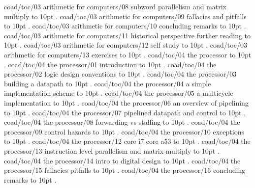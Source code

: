 \smallskip
coad/toc/03 arithmetic for computers/08 subword parallelism and matrix multiply \leaders\hbox to 10pt {\hss.\hss}  \hfill {}
\smallskip
coad/toc/03 arithmetic for computers/09 fallacies and pitfalls \leaders\hbox to 10pt {\hss.\hss}  \hfill {}
\smallskip
coad/toc/03 arithmetic for computers/10 concluding remarks \leaders\hbox to 10pt {\hss.\hss}  \hfill {}
\smallskip
coad/toc/03 arithmetic for computers/11 historical perspective further reading \leaders\hbox to 10pt {\hss.\hss}  \hfill {}
\smallskip
coad/toc/03 arithmetic for computers/12 self study \leaders\hbox to 10pt {\hss.\hss}  \hfill {}
\smallskip
coad/toc/03 arithmetic for computers/13 exercises \leaders\hbox to 10pt {\hss.\hss}  \hfill {}
\smallskip
coad/toc/04 the processor \leaders\hbox to 10pt {\hss.\hss}  \hfill {}
\smallskip
coad/toc/04 the processor/01 introduction \leaders\hbox to 10pt {\hss.\hss}  \hfill {}
\smallskip
coad/toc/04 the processor/02 logic design conventions \leaders\hbox to 10pt {\hss.\hss}  \hfill {}
\smallskip
coad/toc/04 the processor/03 building a datapath \leaders\hbox to 10pt {\hss.\hss}  \hfill {}
\smallskip
coad/toc/04 the processor/04 a simple implementation scheme \leaders\hbox to 10pt {\hss.\hss}  \hfill {}
\smallskip
coad/toc/04 the processor/05 a multicycle implementation \leaders\hbox to 10pt {\hss.\hss}  \hfill {}
\smallskip
coad/toc/04 the processor/06 an overview of pipelining \leaders\hbox to 10pt {\hss.\hss}  \hfill {}
\smallskip
coad/toc/04 the processor/07 pipelined datapath and control \leaders\hbox to 10pt {\hss.\hss}  \hfill {}
\smallskip
coad/toc/04 the processor/08 forwarding vs stalling \leaders\hbox to 10pt {\hss.\hss}  \hfill {}
\smallskip
coad/toc/04 the processor/09 control hazards \leaders\hbox to 10pt {\hss.\hss}  \hfill {}
\smallskip
coad/toc/04 the processor/10 exceptions \leaders\hbox to 10pt {\hss.\hss}  \hfill {}
\smallskip
coad/toc/04 the processor/12 core i7 core a53 \leaders\hbox to 10pt {\hss.\hss}  \hfill {}
\smallskip
coad/toc/04 the processor/13 instruction level parallelism and matrix multiply \leaders\hbox to 10pt {\hss.\hss}  \hfill {}
\smallskip
coad/toc/04 the processor/14 intro to digital design \leaders\hbox to 10pt {\hss.\hss}  \hfill {}
\smallskip
coad/toc/04 the processor/15 fallacies pitfalls \leaders\hbox to 10pt {\hss.\hss}  \hfill {}
\smallskip
coad/toc/04 the processor/16 concluding remarks \leaders\hbox to 10pt {\hss.\hss}  \hfill {}

